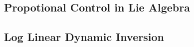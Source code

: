 \documentclass[../main.tex]{subfiles}
\begin{document}
\subsection{Propotional Control in Lie Algebra}

\subsection{Log Linear Dynamic Inversion}
\end{document}
